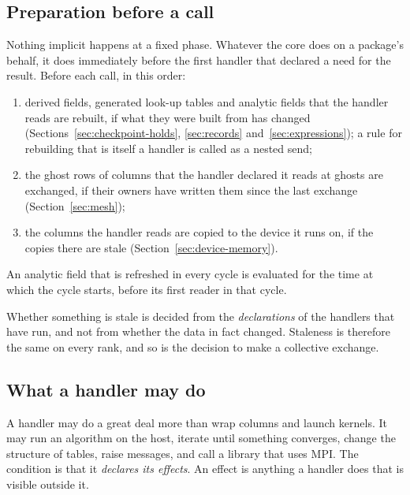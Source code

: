 \documentclass[11pt,a4paper]{article}
\begin{document}
\subsection{Preparation before a call}
\label{sec:preparation}

Nothing implicit happens at a fixed phase.  Whatever the core does on a
package's behalf, it does immediately before the first handler that declared
a need for the result.  Before each call, in this order:

\begin{enumerate}
  \item derived fields, generated look-up tables and analytic fields that
        the handler reads are rebuilt, if what they were built from has
        changed (Sections~\ref{sec:checkpoint-holds}, \ref{sec:records}
        and~\ref{sec:expressions}); a rule for rebuilding that is itself a
        handler is called as a nested send;
  \item the ghost rows of columns that the handler declared it reads at
        ghosts are exchanged, if their owners have written them since the
        last exchange (Section~\ref{sec:mesh});
  \item the columns the handler reads are copied to the device it runs on,
        if the copies there are stale (Section~\ref{sec:device-memory}).
\end{enumerate}

An analytic field that is refreshed in every cycle is evaluated for the
time at which the cycle starts, before its first reader in that cycle.

Whether something is stale is decided from the \emph{declarations} of the
handlers that have run, and not from whether the data in fact changed.
Staleness is therefore the same on every rank, and so is the decision to
make a collective exchange.

\subsection{What a handler may do}
\label{sec:effects}

A handler may do a great deal more than wrap columns and launch kernels.  It
may run an algorithm on the host, iterate until something converges, change
the structure of tables, raise messages, and call a library that uses MPI.
The condition is that it \emph{declares its effects}.  An effect is anything
a handler does that is visible outside it.
\end{document}
